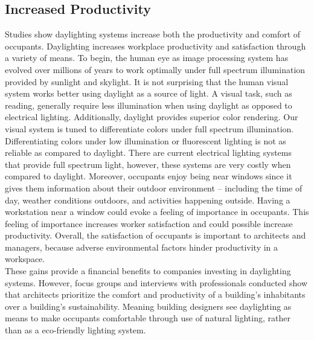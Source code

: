 	\subsection{Increased Productivity}
		Studies show daylighting systems increase both the productivity and comfort of occupants\cite{Menzies}.  Daylighting increases workplace productivity and satisfaction through a variety of means. To begin, the human eye as image processing system has evolved over millions of years to work optimally under full spectrum illumination provided by sunlight and skylight. It is not surprising that the human visual system works better using daylight as a source of light. A visual task, such as reading, generally require less illumination when using daylight as opposed to electrical lighting\cite{Robbins}. Additionally, daylight provides superior color rendering. Our visual system is tuned to differentiate colors under full spectrum illumination. Differentiating colors under low illumination or fluorescent lighting is not as reliable as compared to daylight\cite{Robbins}. There are current electrical lighting systems that provide full spectrum light, however, these systems are very costly when compared to daylight. Moreover, occupants enjoy being near windows since it gives them information about their outdoor environment -- including the time of day, weather conditions outdoors, and activities happening outside. Having a workstation near a window could evoke a feeling of importance in occupants. This feeling of importance increases worker satisfaction and could possible increase productivity\cite{Leslie}. Overall, the satisfaction of occupants is important to architects and managers, because adverse environmental factors hinder productivity in a workspace.  \\

		These gains provide a financial benefits to companies investing in daylighting systems. However, focus groups and interviews with professionals conducted show that architects prioritize the comfort and productivity of a building’s inhabitants over a building’s sustainability\cite{Menzies}. Meaning building designers see daylighting as means to make occupants comfortable through use of natural lighting, rather than as a eco-friendly lighting system. \\

